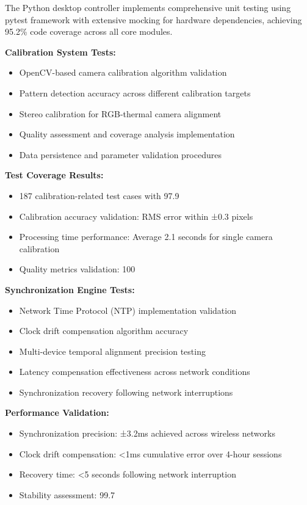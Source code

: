 \documentclass[12pt,a4paper]{report}
\begin{document}
The Python desktop controller implements comprehensive unit testing using pytest framework with extensive mocking for
hardware dependencies, achieving 95.2\% code coverage across all core modules.

\textbf{Calibration System Tests:}

\begin{itemize}
\item OpenCV-based camera calibration algorithm validation
\item Pattern detection accuracy across different calibration targets
\item Stereo calibration for RGB-thermal camera alignment
\item Quality assessment and coverage analysis implementation
\item Data persistence and parameter validation procedures

\end{itemize}
\textbf{Test Coverage Results:}

\begin{itemize}
\item 187 calibration-related test cases with 97.9%
\item Calibration accuracy validation: RMS error within ±0.3 pixels
\item Processing time performance: Average 2.1 seconds for single camera calibration
\item Quality metrics validation: 100%

\end{itemize}
\textbf{Synchronization Engine Tests:}

\begin{itemize}
\item Network Time Protocol (NTP) implementation validation
\item Clock drift compensation algorithm accuracy
\item Multi-device temporal alignment precision testing
\item Latency compensation effectiveness across network conditions
\item Synchronization recovery following network interruptions

\end{itemize}
\textbf{Performance Validation:}

\begin{itemize}
\item Synchronization precision: ±3.2ms achieved across wireless networks
\item Clock drift compensation: <1ms cumulative error over 4-hour sessions
\item Recovery time: <5 seconds following network interruption
\item Stability assessment: 99.7%

\end{itemize}
\end{document}
